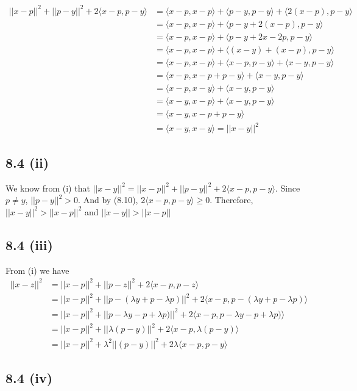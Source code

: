 \documentclass[letterpaper,12pt]{article}
\theoremstyle{definition}
\begin{document}
\begin{align*}
||x-p||^2 + ||p-y||^2 +2\langle x-p,p-y\rangle
&= \langle x-p,x-p\rangle + \langle p-y,p-y\rangle +\langle 2(x-p),p-y\rangle\\
&= \langle x-p,x-p\rangle + \langle p-y + 2(x-p),p-y\rangle\\
&=\langle x-p,x-p\rangle + \langle p-y + 2x-2p,p-y\rangle\\
 &=\langle x-p,x-p\rangle + \langle (x-y) + (x-p),p-y\rangle\\
 &=\langle x-p,x-p\rangle + \langle x-p,p-y\rangle + \langle x-y,p-y\rangle\\
 &= \langle x-p,x-p +p-y\rangle + \langle x-y,p-y\rangle\\
 &= \langle x-p,x-y\rangle + \langle x-y,p-y\rangle\\
 &= \langle x-y,x-p\rangle + \langle x-y,p-y\rangle\\
 &= \langle x-y,x-p +p-y\rangle\\
 &= \langle x-y,x-y\rangle = ||x-y||^2 
\end{align*}

\subsection*{8.4 (ii)}


We know from (i) that $||x-y||^2 = ||x-p||^2 + ||p-y||^2 +2\langle x-p,p-y\rangle$. Since $p\neq y$, $||p-y||^2 > 0$. And by (8.10), $2\langle x-p,p-y\rangle \geq 0$. Therefore, $||x-y||^2 > ||x-p||^2$ and $ ||x-y|| > ||x-p||$ 

\subsection*{8.4 (iii)}

From (i) we have 
\begin{align*}
||x-z||^2 &= ||x-p||^2 + ||p-z||^2 +2\langle x-p,p-z\rangle\\
 &= ||x-p||^2 + ||p-(\lambda y + p-\lambda p)||^2 +2\langle x-p,p-(\lambda y + p-\lambda p)\rangle\\
 &= ||x-p||^2 + ||p-\lambda y - p +\lambda p)||^2 +2\langle x-p,p-\lambda y - p + \lambda p)\rangle\\
 &= ||x-p||^2 + ||\lambda(p- y)||^2 +2\langle x-p,\lambda(p- y)\rangle\\
 &= ||x-p||^2 + \lambda^2||(p- y)||^2 +2\lambda \langle x-p,p- y\rangle
\end{align*}

\subsection*{8.4 (iv)}
\end{document}
